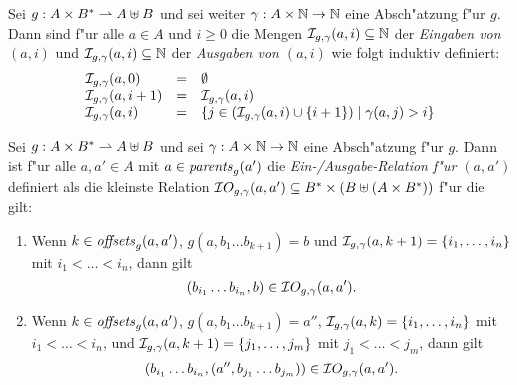\documentclass[12pt,a4paper]{article}
\begin{document}
\begin{definition}
  Sei $g: A \times B^* \rightharpoonup A \uplus B$ und sei weiter $\gamma: A \times \mathbb N \to \mathbb N$ eine Absch"atzung
  f"ur $g$. Dann sind f"ur alle $a \in A$ und $i \ge 0$ die Mengen $\mathcal I_{g,\gamma}(a,i) \subseteq \mathbb N$ der
  \emph{Eingaben von $(a,i)$} und $\mathcal I_{g,\gamma}(a,i) \subseteq \mathbb N$ der \emph{Ausgaben von $(a,i)$} wie folgt
  induktiv definiert:
  \[\begin{array}{lcl}
    \mathcal I_{g,\gamma}(a,0)
    &=& \emptyset \\
    \mathcal I_{g,\gamma}(a,i+1)
    &=& \mathcal I_{g,\gamma}(a,i) \\
    \mathcal I_{g,\gamma}(a,i)
    &=& \{j\in(\mathcal I_{g,\gamma}(a,i)\cup\{i+1\}) \mid \gamma(a,j) > i \} \\
  \end{array}\]
\end{definition}

\begin{definition}
  Sei $g: A \times B^* \rightharpoonup A \uplus B$ und sei $\gamma: A \times \mathbb N \to \mathbb N$ eine Absch"atzung f"ur $g$.
  Dann ist f"ur alle $a,a' \in A$ mit $a \in \mathit{parents}_g(a')$ die \emph{Ein-/Ausgabe-Relation f"ur $(a,a')$}
  definiert als die kleinste Relation $\mathcal IO_{g,\gamma}(a,a') \subseteq B^* \times (B \uplus (A \times B^*))$
  f"ur die gilt:
  \begin{enumerate}
  \item Wenn $k \in \mathit{offsets}_g(a,a')$, $g(a,b_1 \ldots b_{k+1}) = b$ und $\mathcal I_{g,\gamma}(a,k+1) = \{i_1,\ldots,i_n\}$ mit
    $i_1 < \ldots < i_n$, dann gilt
    \[(b_{i_1} \ldots b_{i_n},b) \in \mathcal IO_{g,\gamma}(a,a').\]
  \item Wenn $k \in \mathit{offsets}_g(a,a')$, $g(a,b_1 \ldots b_{k+1}) = a''$, $\mathcal I_{g,\gamma}(a,k) = \{i_1,\ldots,i_n\}$ mit
    $i_1 < \ldots < i_n$, und $\mathcal I_{g,\gamma}(a,k+1) = \{j_1,\ldots,j_m\}$ mit
    $j_1 < \ldots < j_m$, dann gilt
    \[(b_{i_1} \ldots b_{i_n},(a'',b_{j_1} \ldots b_{j_m})) \in \mathcal IO_{g,\gamma}(a,a').\]
  \end{enumerate}
\end{definition}
\end{document}
